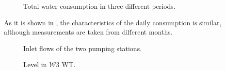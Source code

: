   \begin{figure}[H]
  \centering
   
  \caption{Total water consumption in three different periods.}
  \label{fig:data_allconsumption}
  \end{figure}

As it is shown in , the characteristics of the daily consumption is similar, although measurements are taken from different months. 

  \begin{figure}[H]
  \centering
   
  \caption{Inlet flows of the two pumping stations.}
  \label{fig:inlet_flows_p1}
  \end{figure}

  \begin{figure}[H]
  \centering
   
  \caption{Level in $\mathcal{W}3$ WT.}
  \label{fig:w3_p1}
  \end{figure}

%   

%   
